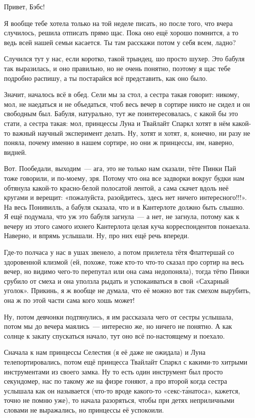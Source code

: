 \documentclass[fontsize=11pt,a5paper,titlepage=firstcover]{scrbook}
\begin{document}
Привет, Бэбс!

Я вообще тебе хотела только на той неделе писать, но после того, что вчера случилось, решила отписать прямо щас. Пока оно ещё хорошо помнится, а то ведь всей нашей семьи касается. Ты там расскажи потом у себя всем, ладно?

Случился тут у нас, если коротко, такой трындец, шо просто шухер. Это бабуля так выразилась, и оно правильно, но не очень понятно, поэтому я щас тебе подробно распишу, а ты постарайся всё представить, как оно было.

Значит, началось всё в обед. Сели мы за стол, а сестра такая говорит: никому, мол, не наедаться и не объедаться, чтоб весь вечер в сортире никто не сидел и он свободным был. Бабуля, натурально, тут же поинтересовалась, с какой бы это стати, а сестра такая: мол, принцессы Луна и Твайлайт Спаркл хотят в нём какой-то важный научный эксперимент делать. Ну, хотят и хотят, я, конечно, ни разу не поняла, почему именно в нашем сортире, но они ж принцессы, им, наверно, видней.

Вот. Пообедали, выходим~--- ага, это не только нам сказали, тёте Пинки Пай тоже говорили, и по-моему, зря. Потому что она все задворки вокруг будки нам обтянула какой-то красно-белой полосатой лентой, а сама скачет вдоль неё кругами и верещит: «пожалуйста, разойдитесь, здесь нет ничего интересного!!!». На весь Понивилль, а бабуля сказала, что и в Кантерлоте должно быть слышно. Я ещё подумала, что уж это бабуля загнула~--- а нет, не загнула, потому как к вечеру из этого самого ихнего Кантерлота целая куча корреспондентов понаехала. Наверно, и впрямь услышали. Ну, про них ещё речь впереди.

Где-то полчаса у нас в ушах звенело, а потом прилетела тётя Флаттершай со здоровенной клизмой (ей, похоже, тоже кто-то что-то сказал про сортир на весь вечер, но видимо чего-то перепутал или она сама недопоняла), тогда тётю Пинки срубило от смеха и она уползла рыдать и успокаиваться в свой «Сахарный уголок». Прикинь, я ж вообще не думала, что её можно вот так смехом вырубить, она ж по этой части сама кого хошь может!

Ну, потом девчонки подтянулись, я им рассказала чего от сестры услышала, потом мы до вечера маялись~--- интересно же, но ничего не понятно. А как солнце к закату спускаться начало, тут оно всё по-настоящему и поехало.

Сначала к нам принцессы Селестия (я её даже не ожидала) и Луна телепортировались, потом ещё принцесса Твайлайт Спаркл с какими-то хитрыми инструментами из своего замка. Ну то есть один инструмент был просто секундомер, нас по такому же на физре гоняют, а про второй когда сестра услышала как он называется (что-то вроде какого-то «секс-та́натоса», кажется, точно не помню уже), то начала разоряться, чтобы при детях неприличными словами не выражались, но принцессы её успокоили.
\end{document}
